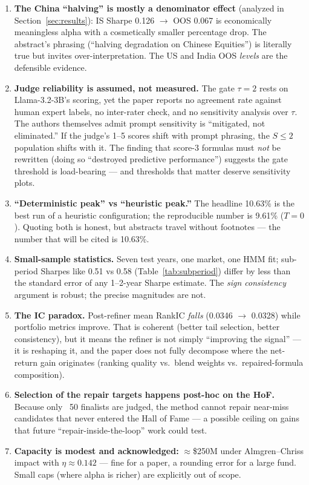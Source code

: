 \documentclass[11pt,a4paper]{article}
\begin{document}
\begin{enumerate}
  \item \textbf{The China ``halving'' is mostly a denominator effect}
  (analyzed in Section~\ref{sec:results}): IS Sharpe 0.126 $\to$ OOS 0.067 is
  economically meaningless alpha with a cosmetically smaller percentage drop.
  The abstract's phrasing (``halving degradation on Chinese Equities'') is
  literally true but invites over-interpretation. The US and India OOS
  \emph{levels} are the defensible evidence.
  \item \textbf{Judge reliability is assumed, not measured.} The gate
  $\tau = 2$ rests on Llama-3.2-3B's scoring, yet the paper reports no
  agreement rate against human expert labels, no inter-rater check, and no
  sensitivity analysis over $\tau$. The authors themselves admit prompt
  sensitivity is ``mitigated, not eliminated.'' If the judge's 1--5 scores
  shift with prompt phrasing, the $S \le 2$ population shifts with it. The
  finding that score-3 formulas must \emph{not} be rewritten (doing so
  ``destroyed predictive performance'') suggests the gate threshold is
  load-bearing --- and thresholds that matter deserve sensitivity plots.
  \item \textbf{``Deterministic peak'' vs ``heuristic peak.''} The headline
  10.63\% is the best run of a heuristic configuration; the reproducible
  number is 9.61\% ($T=0$). Quoting both is honest, but abstracts travel
  without footnotes --- the number that will be cited is 10.63\%.
  \item \textbf{Small-sample statistics.} Seven test years, one market, one
  HMM fit; sub-period Sharpes like 0.51 vs 0.58 (Table~\ref{tab:subperiod})
  differ by less than the standard error of any 1--2-year Sharpe estimate.
  The \emph{sign consistency} argument is robust; the precise magnitudes are
  not.
  \item \textbf{The IC paradox.} Post-refiner mean RankIC \emph{falls}
  (0.0346 $\to$ 0.0328) while portfolio metrics improve. That is coherent
  (better tail selection, better consistency), but it means the refiner is
  not simply ``improving the signal'' --- it is reshaping it, and the paper
  does not fully decompose where the net-return gain originates (ranking
  quality vs.\ blend weights vs.\ repaired-formula composition).
  \item \textbf{Selection of the repair targets happens post-hoc on the HoF.}
  Because only ~50 finalists are judged, the method cannot repair
  near-miss candidates that never entered the Hall of Fame --- a possible
  ceiling on gains that future ``repair-inside-the-loop'' work could test.
  \item \textbf{Capacity is modest and acknowledged:} $\approx$\$250M under
  Almgren--Chriss impact with $\eta \approx 0.142$ --- fine for a paper, a
  rounding error for a large fund. Small caps (where alpha is richer) are
  explicitly out of scope.
\end{enumerate}
\end{document}
